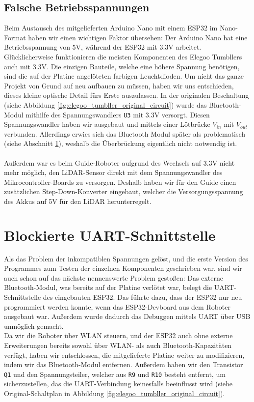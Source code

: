 \subsection{Falsche Betriebsspannungen}
\label{subsec:problem_betriebsspannungen}
Beim Austausch des mitgelieferten Arduino Nano mit einem ESP32 im Nano-Format haben wir einen wichtigen Faktor übersehen:
%
Der Arduino Nano hat eine Betriebsspannung von 5V,
während der ESP32 mit 3.3V arbeitet.
%
Glücklicherweise funktionieren die meisten Komponenten des Elegoo Tumbllers auch mit 3.3V.
%
Die einzigen Bauteile,
welche eine höhere Spannung benötigen,
sind die auf der Platine angelöteten farbigen Leuchtdioden.
%
Um nicht das ganze Projekt von Grund auf neu aufbauen zu müssen,
haben wir uns entschieden,
dieses kleine optische Detail fürs Erste auszulassen.
%
In der originalen Beschaltung (siehe Abbildung \ref{fig:elegoo_tumbller_original_circuit})
wurde das Bluetooth-Modul mithilfe des Spannungswandlers \texttt{U3} mit 3.3V versorgt.
%
Diesen Spannungswandler haben wir ausgebaut und mittels einer Lötbrücke $V_{in}$ mit $V_{out}$ verbunden.
Allerdings erwies sich das Bluetooth Modul später als problematisch (siehe Abschnitt \ref{subsec:problem_bluetooth_serial}),
weshalb die Überbrückung eigentlich nicht notwendig ist.
\\\\
Außerdem war es beim Guide-Roboter aufgrund des Wechsels auf 3.3V nicht mehr möglich,
den LiDAR-Sensor direkt mit dem Spannungswandler des Mikrocontroller-Boards zu versorgen.
%
Deshalb haben wir für den Guide einen zusätzlichen Step-Down-Konverter eingebaut,
welcher die Versorgungsspannung des Akkus auf 5V für den LiDAR herunterregelt.
\section{Blockierte UART-Schnittstelle}
\label{subsec:problem_bluetooth_serial}
Als das Problem der inkompatiblen Spannungen gelöst,
und die erste Version des Programmes zum Testen der einzelnen Komponenten geschrieben war,
sind wir auch schon auf das nächste nennenswerte Problem gestoßen:
%
Das externe Bluetooth-Modul,
was bereits auf der Platine verlötet war,
belegt die UART-Schnittstelle des eingebauten ESP32.
%
Das führte dazu, dass der ESP32 nur neu programmiert werden konnte,
wenn das ESP32-Devboard aus dem Roboter ausgebaut war.
%
Außerdem wurde dadurch das Debuggen mittels UART über USB unmöglich gemacht.
\\
Da wir die Roboter über WLAN steuern,
und der ESP32 auch ohne externe Erweiterungen bereits sowohl über WLAN- als auch Bluetooth-Kapazitäten verfügt,
haben wir entschlossen,
die mitgelieferte Platine weiter zu modifizieren,
indem wir das Bluetooth-Modul entfernen.
%
Außerdem haben wir den Transistor \texttt{Q1} und den Spannungsteiler,
welcher aus \texttt{R9} und \texttt{R10} besteht entfernt,
um sicherzustellen, das die UART-Verbindung keinesfalls beeinflusst wird
(siehe Original-Schaltplan in Abbildung \ref{fig:elegoo_tumbller_original_circuit}).


